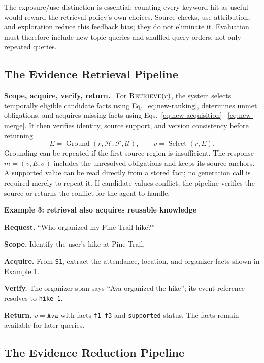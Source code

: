 \documentclass[10pt,twocolumn]{article}
\newcommand{\Hh}{\mathcal{H}}
\newcommand{\Ff}{\mathcal{F}}
\newcommand{\Uu}{\mathcal{U}}
\newcommand{\ret}{\textsc{Retrieve}}
\newcommand{\runin}[1]{\smallskip\noindent\textbf{#1.}\ }
\newenvironment{memoryexample}[1]{%
  \def\FrameCommand{\fboxrule=0.7pt\fboxsep=6pt\fbox}%
  \begin{framed}\small\noindent\textbf{#1}\par\smallskip
}{\end{framed}}
\begin{document}
The exposure/use distinction is essential: counting every keyword hit
as useful would reward the retrieval policy's own choices. Source
checks, use attribution, and exploration reduce this feedback bias;
they do not eliminate it. Evaluation must therefore include new-topic
queries and shuffled query orders, not only repeated queries.

\subsection{The Evidence Retrieval Pipeline}
\label{subsec:new-retrieve}

\runin{Scope, acquire, verify, return}
For $\ret(r)$, the system selects temporally eligible candidate facts
using Eq.~\eqref{eq:new-ranking}, determines unmet obligations, and
acquires missing facts using Eqs.~\eqref{eq:new-acquisition}--
\eqref{eq:new-merge}. It then verifies identity, source support, and
version consistency before returning
\begin{equation}
\label{eq:new-retrieve}
E=\operatorname{Ground}(r,\Hh,\Ff,\Uu),\qquad
v=\operatorname{Select}(r,E).
\end{equation}
Grounding can be repeated if the first source region is insufficient.
The response $m=(v,E,\sigma)$ includes the unresolved obligations and
keeps its source anchors. A supported value can be read directly from
a stored fact; no generation call is required merely to repeat it.
If candidate values conflict, the pipeline verifies the source or
returns the conflict for the agent to handle.

\begin{memoryexample}{Example 3: retrieval also acquires reusable knowledge}
\textbf{Request.} ``Who organized my Pine Trail hike?''
\par\textbf{Scope.} Identify the user's hike at Pine Trail.
\par\textbf{Acquire.} From \texttt{S1}, extract the attendance, location,
and organizer facts shown in Example 1.
\par\textbf{Verify.} The organizer span says ``Ava organized the hike'';
its event reference resolves to \texttt{hike-1}.
\par\textbf{Return.} $v=\texttt{Ava}$ with facts \texttt{f1--f3} and
\texttt{supported} status. The facts remain available for later queries.
\end{memoryexample}

\subsection{The Evidence Reduction Pipeline}
\label{subsec:new-reduce}
\end{document}
